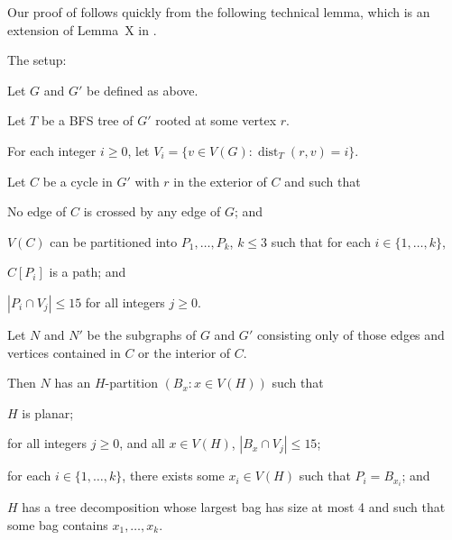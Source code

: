 \documentclass{patmorin}
\DeclareMathOperator{\dist}{dist}
\begin{document}
Our proof of  follows quickly from the following technical lemma, which is an extension of Lemma~X in \citet{dujmovic.joret.ea:planar}.
\begin{lem} The setup:
  \begin{compactenum}
    \item Let $G$ and $G'$ be defined as above.
    \item Let $T$ be a BFS tree of $G'$ rooted at some vertex $r$.
    \item For each integer $i\ge 0$, let $V_i=\{v\in V(G):\dist_T(r,v)=i\}$. 
    \item Let $C$ be a cycle in $G'$ with $r$ in the exterior of $C$ and such that
    \begin{compactenum} 
      \item No edge of $C$ is crossed by any edge of $G$; and
      \item $V(C)$ can be partitioned into $P_1,\ldots,P_k$, $k\le 3$ such that for each $i\in\{1,\ldots,k\}$,
      \begin{compactenum}
        \item $C[P_i]$ is a path; and
        \item $|P_i\cap V_j| \le 15$ for all integers $j\ge 0$.
      \end{compactenum}
    \end{compactenum}
    \item Let $N$ and $N'$ be the subgraphs of $G$ and $G'$ consisting only of those edges and vertices contained in $C$ or the interior of $C$.
  \end{compactenum}
  Then $N$ has an $H$-partition $(B_x : x\in V(H))$ such that
  \begin{compactenum}
    \item $H$ is planar;
    \item for all integers $j\ge 0$, and all $x\in V(H)$, $|B_x\cap V_j|\le 15$; 
    \item for each $i\in\{1,\ldots,k\}$, there exists some $x_i\in V(H)$ such that $P_i=B_{x_i}$; and
    \item $H$ has a tree decomposition whose largest bag has size at most 4 and such that some bag contains $x_1,\ldots,x_k$.
  \end{compactenum}
\end{lem}
\end{document}
